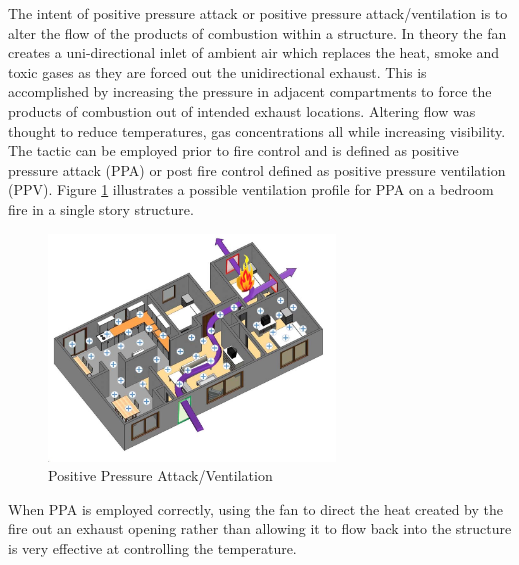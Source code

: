 \documentclass{article}
\begin{document}
The intent of positive pressure attack or positive pressure attack/ventilation is to alter the flow of the products of combustion within a structure. In theory the fan creates a uni-directional inlet of ambient air which replaces the heat, smoke and toxic gases as they are forced out the unidirectional exhaust. This is accomplished by increasing the pressure in adjacent compartments to force the products of combustion out of intended exhaust locations. Altering flow was thought to reduce temperatures, gas concentrations all while increasing visibility. The tactic can be employed prior to fire control and is defined as positive pressure attack (PPA) or post fire control defined as positive pressure ventilation (PPV).  Figure \ref{fig:PPAConcept} illustrates a possible ventilation profile for PPA on a bedroom fire in a single story structure. 

\begin{figure}[H]
	\centering
	\includegraphics[width = 3in]{0_Images/Tactical_Considerations/Understanding_Basics/Positive_Pressure.jpg}
	\caption{Positive Pressure Attack/Ventilation}
	\label{fig:PPAConcept}
\end{figure}

When PPA is employed correctly, using the fan to direct the heat created by the fire out an exhaust opening rather than allowing it to flow back into the structure is very effective at controlling the temperature. 
\end{document}
